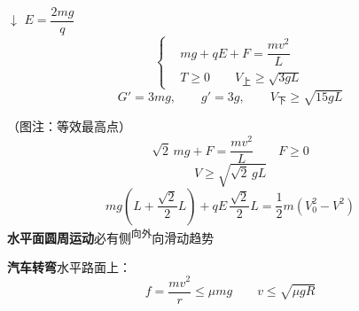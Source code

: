 $\downarrow$ $E=\dfrac{2mg}{q}$
\[
\left\{\begin{aligned}
&mg+qE+F=\dfrac{mv^2}{L}\\
&T\ge 0\qquad V_{\text{上}}\ge\sqrt{3gL}
\end{aligned}\right.
\]
\[ G'=3mg,\qquad g'=3g,\qquad V_{\text{下}}\ge\sqrt{15gL} \]

（图注：等效最高点）
\[ \sqrt2\,mg+F=\dfrac{mv^2}{L}\qquad F\ge 0 \]
\[ V\ge\sqrt{\sqrt2\,gL} \]
\[ mg\left(L+\dfrac{\sqrt2}{2}L\right)+qE\,\dfrac{\sqrt2}{2}L=\dfrac12m\left(V_0^2-V^2\right) \]
\textbf{水平面圆周运动}\quad 必有侧\textsuperscript{向外}向滑动趋势

\textbf{汽车转弯}\quad 水平路面上：
\[ f=\dfrac{mv^2}{r}\le\mu mg\qquad v\le\sqrt{\mu gR} \]

